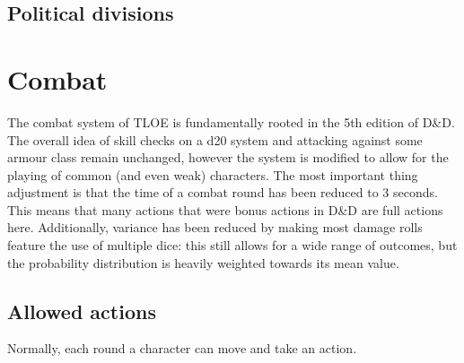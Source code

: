 \documentclass[letterpaper,12pt]{article}
\begin{document}
\subsection{Political divisions}\label{PoliticalDivisions}


\section{Combat}\label{Combat}

The combat system of TLOE is fundamentally rooted in the 5th edition of D\&D. The overall idea of skill checks on a d20 system and attacking against some armour class remain unchanged, however the system is modified to allow for the playing of common (and even weak) characters. The most important thing adjustment is that the time of a combat round has been reduced to 3 seconds. This means that many actions that were bonus actions in D\&D are full actions here. Additionally, variance has been reduced by making most damage rolls feature the use of multiple dice: this still allows for a wide range of outcomes, but the probability distribution is heavily weighted towards its mean value. 

\subsection{Allowed actions}

Normally, each round a character can move and take an action.
\end{document}
